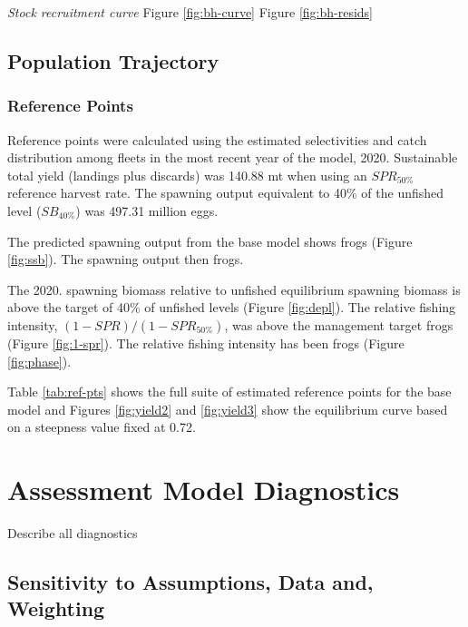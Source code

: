 \documentclass[
  english,
  a4paper,
]{article}
\begin{document}
\emph{Stock recruitment curve}
Figure \ref{fig:bh-curve}
Figure \ref{fig:bh-resids}

\hypertarget{population-trajectory}{%
\subsection{Population Trajectory}\label{population-trajectory}}

\hypertarget{reference-points-1}{%
\subsubsection{Reference Points}\label{reference-points-1}}

Reference points were calculated using the estimated selectivities and catch distribution among fleets in the most recent year of the model, 2020.
Sustainable total yield (landings plus discards) was
140.88 mt when using an \(SPR_{50\%}\)
reference harvest rate. The spawning output equivalent to 40\% of the unfished level (\(SB_{40\%}\)) was 497.31
million eggs.

The predicted spawning output from the base model shows frogs (Figure \ref{fig:ssb}). The spawning output then frogs.

The 2020. spawning biomass relative to unfished equilibrium spawning biomass is above the target of 40\% of unfished levels (Figure \ref{fig:depl}).
The relative fishing intensity, \((1-SPR)/(1-SPR_{50\%})\), was above the management target frogs (Figure \ref{fig:1-spr}). The relative fishing intensity has been frogs (Figure \ref{fig:phase}).

Table \ref{tab:ref-pts} shows the full suite of estimated reference points for the base model and Figures \ref{fig:yield2} and \ref{fig:yield3} show the equilibrium curve based on a steepness value fixed at 0.72.

\hypertarget{assessment-model-diagnostics}{%
\section{Assessment Model Diagnostics}\label{assessment-model-diagnostics}}

Describe all diagnostics

\hypertarget{sensitivity-to-assumptions-data-and-weighting}{%
\subsection{Sensitivity to Assumptions, Data and, Weighting}\label{sensitivity-to-assumptions-data-and-weighting}}
\end{document}
